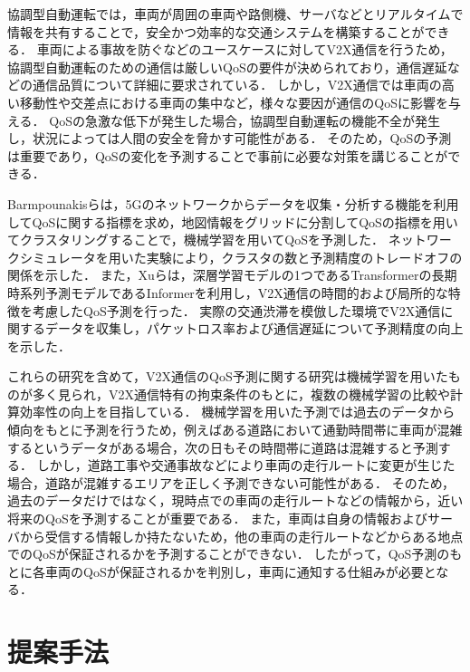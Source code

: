 \documentclass[a4paper,11pt,uplatex]{ujreport}
\begin{document}
  協調型自動運転では，車両が周囲の車両や路側機、サーバなどとリアルタイムで情報を共有することで，安全かつ効率的な交通システムを構築することができる．
  車両による事故を防ぐなどのユースケースに対してV2X通信を行うため，協調型自動運転のための通信は厳しいQoSの要件が決められており，通信遅延などの通信品質について詳細に要求されている\cite{5GAA}．
  しかし，V2X通信では車両の高い移動性や交差点における車両の集中など，様々な要因が通信のQoSに影響を与える\cite{cause}．
  QoSの急激な低下が発生した場合，協調型自動運転の機能不全が発生し，状況によっては人間の安全を脅かす可能性がある\cite{danger}．
  そのため，QoSの予測は重要であり，QoSの変化を予測することで事前に必要な対策を講じることができる．\par
  Barmpounakisらは，5Gのネットワークからデータを収集・分析する機能を利用してQoSに関する指標を求め，地図情報をグリッドに分割してQoSの指標を用いてクラスタリングすることで，機械学習を用いてQoSを予測した\cite{AI}．
  ネットワークシミュレータを用いた実験により，クラスタの数と予測精度のトレードオフの関係を示した．
  また，Xuらは，深層学習モデルの1つであるTransformer\cite{Transformer}の長期時系列予測モデルであるInformer\cite{Informer}を利用し，V2X通信の時間的および局所的な特徴を考慮したQoS予測を行った\cite{Informer-based}．
  実際の交通渋滞を模倣した環境でV2X通信に関するデータを収集し，パケットロス率および通信遅延について予測精度の向上を示した．\par
  これらの研究を含めて，V2X通信のQoS予測に関する研究は機械学習を用いたものが多く見られ，V2X通信特有の拘束条件のもとに，複数の機械学習の比較や計算効率性の向上を目指している．
  機械学習を用いた予測では過去のデータから傾向をもとに予測を行うため，例えばある道路において通勤時間帯に車両が混雑するというデータがある場合，次の日もその時間帯に道路は混雑すると予測する．
  しかし，道路工事や交通事故などにより車両の走行ルートに変更が生じた場合，道路が混雑するエリアを正しく予測できない可能性がある．
  そのため，過去のデータだけではなく，現時点での車両の走行ルートなどの情報から，近い将来のQoSを予測することが重要である．
  また，車両は自身の情報およびサーバから受信する情報しか持たないため，他の車両の走行ルートなどからある地点でのQoSが保証されるかを予測することができない．
  したがって，QoS予測のもとに各車両のQoSが保証されるかを判別し，車両に通知する仕組みが必要となる．

\chapter{提案手法}
\label{chap:提案手法}
\end{document}
